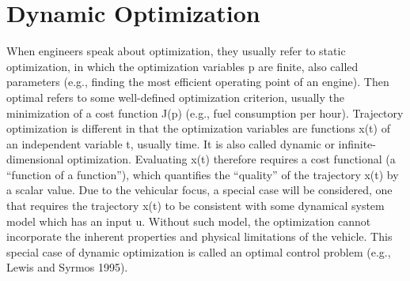 \section{Dynamic Optimization}\label{S:DO}

When engineers speak about optimization, they usually refer to static optimization, in which the optimization variables p are finite, also called parameters (e.g., finding the most efficient operating point of an engine). Then optimal refers to some well-defined optimization criterion, usually the minimization of a cost function J(p) (e.g., fuel consumption per hour). 
Trajectory optimization is different in that the optimization variables are functions x(t) of an independent variable t, usually time. It is also called dynamic or infinite-dimensional optimization. Evaluating x(t) therefore requires a cost functional (a “function of a function”), which quantifies the “quality” of the trajectory x(t) by a scalar value. 
Due to the vehicular focus, a special case will be considered, one that requires the trajectory x(t) to be consistent with some dynamical system model which has an input u. Without such model, the optimization cannot incorporate the inherent properties and physical limitations of the vehicle. This special case of dynamic optimization is called an optimal control problem (e.g., Lewis and Syrmos 1995).
